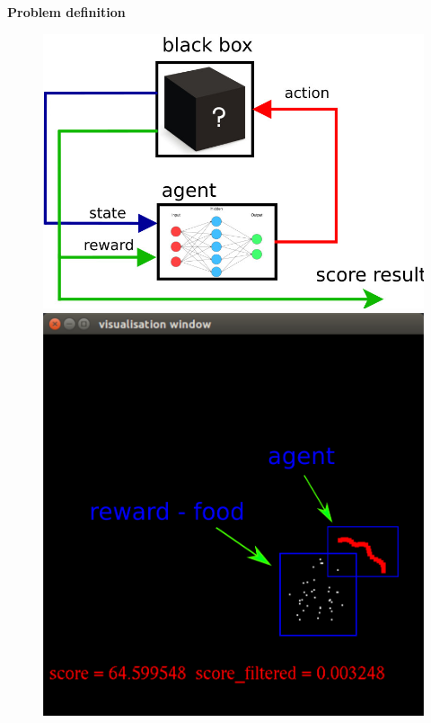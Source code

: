 \documentclass[xcolor=dvipsnames]{beamer}
\begin{document}
\begin{frame}{\bf Problem definition}
\begin{figure}
\centering
\begin{minipage}{.5\textwidth}
  \centering
  \includegraphics[scale=0.2]{../../diagrams/rl_mechanism.jpg}
\end{minipage}%
\begin{minipage}{.5\textwidth}
  \centering
  \includegraphics[scale=0.2]{../../diagrams/worms_rl_game_desc.png}
\end{minipage}
\end{figure}



\end{frame}
\end{document}
